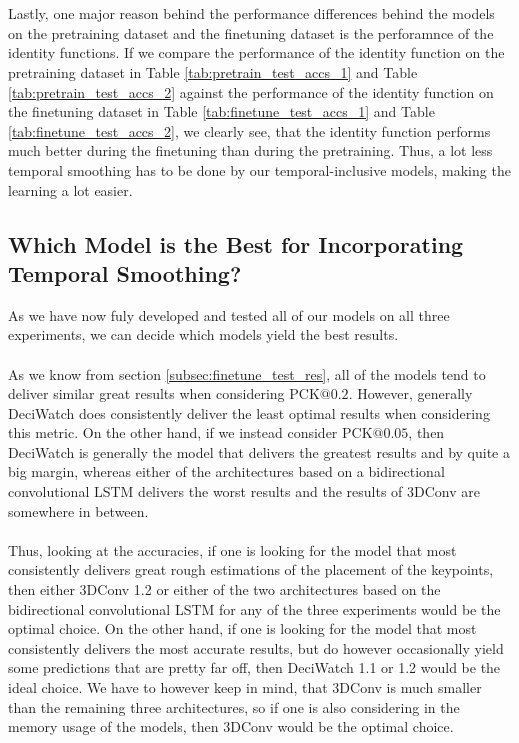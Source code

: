 \documentclass[./main.tex]{subfiles}
\begin{document}
\\
\\
Lastly, one major reason behind the performance differences behind the models on the pretraining dataset and the finetuning dataset is the perforamnce of the identity functions. If we compare the performance of the identity function on the pretraining dataset in Table \ref{tab:pretrain_test_accs_1} and Table \ref{tab:pretrain_test_accs_2} against the performance of the identity function on the finetuning dataset in Table \ref{tab:finetune_test_accs_1} and Table \ref{tab:finetune_test_accs_2}, we clearly see, that the identity function performs much better during the finetuning than during the pretraining. Thus, a lot less temporal smoothing has to be done by our temporal-inclusive models, making the learning a lot easier.

\subsection{Which Model is the Best for Incorporating Temporal Smoothing?}
\label{sec:best_model}
As we have now fuly developed and tested all of our models on all three experiments, we can decide which models yield the best results.
\\
\\
As we know from section \ref{subsec:finetune_test_res}, all of the models tend to deliver similar great results when considering PCK$@0.2$. However, generally DeciWatch does consistently deliver the least optimal results when considering this metric. On the other hand, if we instead consider PCK$@0.05$, then DeciWatch is generally the model that delivers the greatest results and by quite a big margin, whereas either of the architectures based on a bidirectional convolutional LSTM delivers the worst results and the results of 3DConv are somewhere in between.
\\
\\
Thus, looking at the accuracies, if one is looking for the model that most consistently delivers great rough estimations of the placement of the keypoints, then either 3DConv 1.2 or either of the two architectures based on the bidirectional convolutional LSTM for any of the three experiments would be the optimal choice. On the other hand, if one is looking for the model that most consistently delivers the most accurate results, but do however occasionally yield some predictions that are pretty far off, then DeciWatch 1.1 or 1.2 would be the ideal choice. We have to however keep in mind, that 3DConv is much smaller than the remaining three architectures, so if one is also considering in the memory usage of the models, then 3DConv would be the optimal choice.
\end{document}
